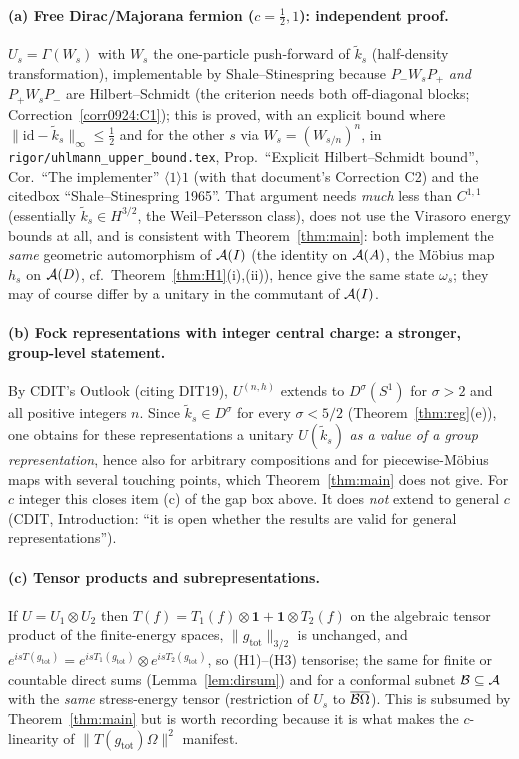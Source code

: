 \documentclass[11pt]{article}
\newcommand{\Om}{\Omega}
\newcommand{\norm}[1]{\lVert #1\rVert}
\newcommand{\gtot}{g_{\mathrm{tot}}}
\newcommand{\ktil}{\widetilde k}
\newcommand{\one}{\mathbf 1}
\begin{document}
\paragraph{(a) Free Dirac/Majorana fermion ($c=\frac12,1$): independent proof.}
$U_s=\Gamma(W_s)$ with $W_s$ the one-particle push-forward of $\ktil_s$ (half-density transformation), implementable
by Shale--Stinespring because $P_-W_sP_+$ \emph{and} $P_+W_sP_-$ are Hilbert--Schmidt (the criterion needs both off-diagonal blocks; Correction~\ref{corr0924:C1}); this is proved, with an explicit bound where $\norm{\mathrm{id}-\ktil_s}_\infty\le\frac12$ and for the other $s$ via $W_s=(W_{s/n})^n$, in
\texttt{rigor/uhlmann\_upper\_bound.tex}, Prop.~``Explicit Hilbert--Schmidt bound'', Cor.~``The implementer'' $\langle1\rangle1$ (with that document's Correction C2) and the citedbox
``Shale--Stinespring 1965''.  That argument needs \emph{much} less than $C^{1,1}$ (essentially
$\ktil_s\in H^{3/2}$, the Weil--Petersson class), does not use the Virasoro energy bounds at all, and is
consistent with Theorem~\ref{thm:main}: both implement the \emph{same} geometric automorphism of $\mathcal A(I)$ (the
identity on $\mathcal A(A)$, the M\"obius map $h_s$ on $\mathcal A(D)$, cf.\ Theorem~\ref{thm:H1}(i),(ii)), hence give the same
state $\omega_s$; they may of course differ by a unitary in the commutant of $\mathcal A(I)$.

\paragraph{(b) Fock representations with integer central charge: a stronger, group-level statement.}
By CDIT's Outlook (citing DIT19), $U^{(n,h)}$ extends to $D^\sigma(S^1)$ for $\sigma>2$ and all positive integers $n$.
Since $\ktil_s\in D^\sigma$ for every $\sigma<5/2$ (Theorem~\ref{thm:reg}(e)), one obtains for these representations a
unitary $U(\ktil_s)$ \emph{as a value of a group representation}, hence also for arbitrary compositions and for
piecewise-M\"obius maps with several touching points, which Theorem~\ref{thm:main} does not give.  For $c$ integer
this closes item (c) of the gap box above.  It does \emph{not} extend to general $c$ (CDIT, Introduction: ``it is
open whether the results are valid for general representations'').

\paragraph{(c) Tensor products and subrepresentations.}
If $U=U_1\otimes U_2$ then $T(f)=T_1(f)\otimes\one+\one\otimes T_2(f)$ on the algebraic tensor product of the
finite-energy spaces, $\norm{\gtot}_{3/2}$ is unchanged, and $e^{isT(\gtot)}=e^{isT_1(\gtot)}\otimes e^{isT_2(\gtot)}$,
so (H1)--(H3) tensorise; the same for finite or countable direct sums (Lemma~\ref{lem:dirsum}) and for a conformal
subnet $\mathcal B\subseteq\mathcal A$ with the \emph{same} stress-energy tensor (restriction of $U_s$ to $\overline{\cB\Om}$).
This is subsumed by Theorem~\ref{thm:main} but is worth recording because it is what makes the $c$-linearity of
$\norm{T(\gtot)\Om}^2$ manifest.
\end{document}
